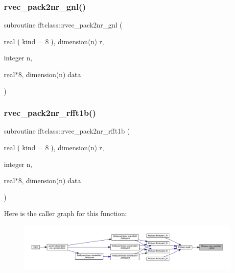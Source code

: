 \subsubsection{\texorpdfstring{rvec\_pack2nr\_gnl()}{rvec\_pack2nr\_gnl()}}
{\footnotesize\ttfamily subroutine fftclass\+::rvec\+\_\+pack2nr\+\_\+gnl (\begin{DoxyParamCaption}\item[{real ( kind = 8 ), dimension(n)}]{r,  }\item[{integer}]{n,  }\item[{real$\ast$8, dimension(n)}]{data }\end{DoxyParamCaption})}

\mbox{\label{namespacefftclass_a49a850047c36eff6fb6d5eb1669cb009}} 
\subsubsection{\texorpdfstring{rvec\_pack2nr\_rfft1b()}{rvec\_pack2nr\_rfft1b()}}
{\footnotesize\ttfamily subroutine fftclass\+::rvec\+\_\+pack2nr\+\_\+rfft1b (\begin{DoxyParamCaption}\item[{real ( kind = 8 ), dimension(n)}]{r,  }\item[{integer}]{n,  }\item[{real$\ast$8, dimension(n)}]{data }\end{DoxyParamCaption})}

Here is the caller graph for this function\+:\nopagebreak
\begin{figure}[H]
\begin{center}
\leavevmode
\includegraphics[width=350pt]{namespacefftclass_a49a850047c36eff6fb6d5eb1669cb009_icgraph}
\end{center}
\end{figure}
\mbox{\label{namespacefftclass_ac898bf50e64ca8c43e8d9fa0c2c85919}} 

